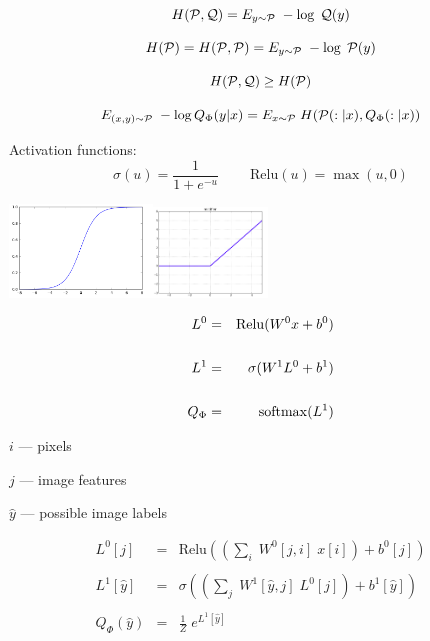 {$$H({\cal P},{\cal Q}) = E_{y \sim {\cal P}}\;-\log\; {\cal Q}(y)$$

$$H({\cal P}) = H({\cal P},{\cal P}) = E_{y \sim {\cal P}}\;-\log\; {\cal P}(y)$$

$$H({\cal P},{\cal Q}) \geq H({\cal P})$$

$$E_{(x,y) \sim {\cal P}}\; -\log Q_\Phi(y|x) = E_{x \sim {\cal P}}\;H({\cal P}(:|x),Q_\Phi(:|x))$$


Activation functions:
$$\sigma(u) = \frac{1}{1+e^{-u}}\;\;\;\;\;\;\;\;\mathrm{Relu}(u) = \max(u,0)$$

\vfill
\centerline{\includegraphics[width=1.5in]{../images/sigmoid}\hspace{1.0in}\includegraphics[width=1.2in]{../images/relu}}

\vfill
\begin{eqnarray*}
  L^0 & = & \mathrm{Relu}(W^0 x + b^0) \\
  \\
  L^1 & = & \sigma(W^1 L^0 + b^1) \\
  \\
  Q_\Phi & = & \operatorname*{softmax}(L^1)
\end{eqnarray*}



$i$ --- pixels

$j$ --- image features

$\hat{y}$ --- possible image labels

\vfill
\begin{eqnarray*}
  L^0[j] & = & \mathrm{Relu}\left(\left(\sum_i\;W^0[j,i] \;x[i]\right) + b^0[j]\right) \\
  \\
  L^1[\hat{y}] & = & \sigma\left(\left(\sum_j\;W^1[\hat{y},j]\;L^0[j]\right) + b^1[\hat{y}]\right) \\
  \\
  Q_\Phi(\hat{y}) & = & \frac{1}{Z} \;e^{L^1[\hat{y}]}
\end{eqnarray*}

}
